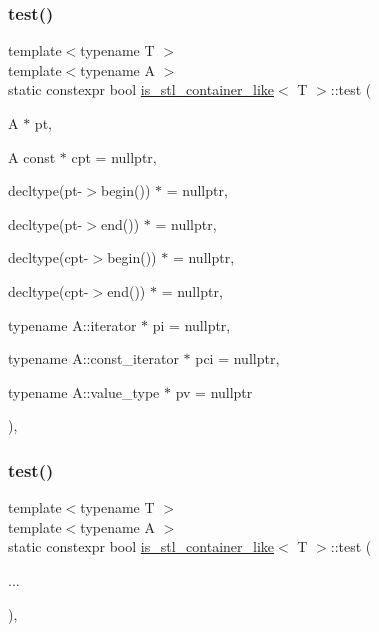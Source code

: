 \subsubsection{\texorpdfstring{test()}{test()}\hspace{0.1cm}{\footnotesize\ttfamily [1/2]}}
{\footnotesize\ttfamily template$<$typename T $>$ \\
template$<$typename A $>$ \\
static constexpr bool \hyperlink{structis__stl__container__like}{is\+\_\+stl\+\_\+container\+\_\+like}$<$ T $>$\+::test (\begin{DoxyParamCaption}\item[{A $\ast$}]{pt,  }\item[{A const $\ast$}]{cpt = {\ttfamily nullptr},  }\item[{decltype(pt-\/$>$begin()) $\ast$}]{ = {\ttfamily nullptr},  }\item[{decltype(pt-\/$>$end()) $\ast$}]{ = {\ttfamily nullptr},  }\item[{decltype(cpt-\/$>$begin()) $\ast$}]{ = {\ttfamily nullptr},  }\item[{decltype(cpt-\/$>$end()) $\ast$}]{ = {\ttfamily nullptr},  }\item[{typename A\+::iterator $\ast$}]{pi = {\ttfamily nullptr},  }\item[{typename A\+::const\+\_\+iterator $\ast$}]{pci = {\ttfamily nullptr},  }\item[{typename A\+::value\+\_\+type $\ast$}]{pv = {\ttfamily nullptr} }\end{DoxyParamCaption})\hspace{0.3cm}{\ttfamily [inline]}, {\ttfamily [static]}}

\mbox{\label{structis__stl__container__like_a44d72e8e872d7eb954dca89f6103e817}} 
\subsubsection{\texorpdfstring{test()}{test()}\hspace{0.1cm}{\footnotesize\ttfamily [2/2]}}
{\footnotesize\ttfamily template$<$typename T $>$ \\
template$<$typename A $>$ \\
static constexpr bool \hyperlink{structis__stl__container__like}{is\+\_\+stl\+\_\+container\+\_\+like}$<$ T $>$\+::test (\begin{DoxyParamCaption}\item[{}]{... }\end{DoxyParamCaption})\hspace{0.3cm}{\ttfamily [inline]}, {\ttfamily [static]}}



